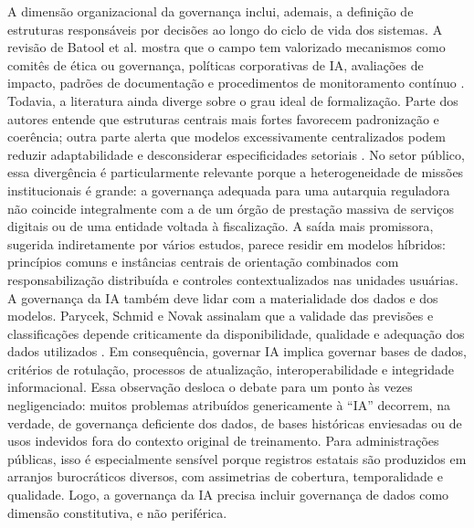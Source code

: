 \documentclass[12pt,a4paper]{article}
\begin{document}
A dimensão organizacional da governança inclui, ademais, a definição de estruturas responsáveis por decisões ao longo do ciclo de vida dos sistemas. A revisão de Batool et al. mostra que o campo tem valorizado mecanismos como comitês de ética ou governança, políticas corporativas de IA, avaliações de impacto, padrões de documentação e procedimentos de monitoramento contínuo \autocite{batool2025ai}. Todavia, a literatura ainda diverge sobre o grau ideal de formalização. Parte dos autores entende que estruturas centrais mais fortes favorecem padronização e coerência; outra parte alerta que modelos excessivamente centralizados podem reduzir adaptabilidade e desconsiderar especificidades setoriais \autocite{sigfrids2022how} \autocite{criado2024artificial}. No setor público, essa divergência é particularmente relevante porque a heterogeneidade de missões institucionais é grande: a governança adequada para uma autarquia reguladora não coincide integralmente com a de um órgão de prestação massiva de serviços digitais ou de uma entidade voltada à fiscalização. A saída mais promissora, sugerida indiretamente por vários estudos, parece residir em modelos híbridos: princípios comuns e instâncias centrais de orientação combinados com responsabilização distribuída e controles contextualizados nas unidades usuárias.
A governança da IA também deve lidar com a materialidade dos dados e dos modelos. Parycek, Schmid e Novak assinalam que a validade das previsões e classificações depende criticamente da disponibilidade, qualidade e adequação dos dados utilizados \autocite{parycek2023artificial}. Em consequência, governar IA implica governar bases de dados, critérios de rotulação, processos de atualização, interoperabilidade e integridade informacional. Essa observação desloca o debate para um ponto às vezes negligenciado: muitos problemas atribuídos genericamente à “IA” decorrem, na verdade, de governança deficiente dos dados, de bases históricas enviesadas ou de usos indevidos fora do contexto original de treinamento. Para administrações públicas, isso é especialmente sensível porque registros estatais são produzidos em arranjos burocráticos diversos, com assimetrias de cobertura, temporalidade e qualidade. Logo, a governança da IA precisa incluir governança de dados como dimensão constitutiva, e não periférica.
\end{document}
